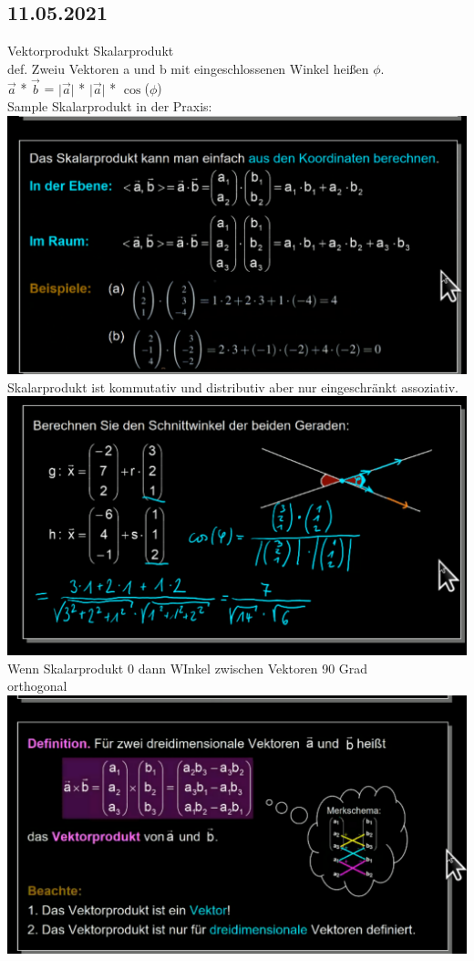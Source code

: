 \documentclass{article}
\begin{document}
	\subsection*{11.05.2021}
	Vektorprodukt Skalarprodukt \\
	def. Zweiu Vektoren a und b mit eingeschlossenen Winkel heißen $\phi$. \\
	$\vec{a}$ * $\vec{b}$ = $|$$\vec{a}$$|$ * $|$$\vec{a}$$|$ * $\cos$($\phi$) \\
	Sample Skalarprodukt in der Praxis: \\
	\includegraphics[width=\linewidth]{Pic01}
	\\
	Skalarprodukt ist kommutativ und distributiv aber nur eingeschränkt assoziativ. \\
	\includegraphics[width=\linewidth]{sampleWinkel}
	\\
	Wenn Skalarprodukt 0 dann WInkel zwischen Vektoren 90 Grad \\
	orthogonal \\
	\includegraphics[width=\linewidth]{VecProd1} \\
\end{document}
